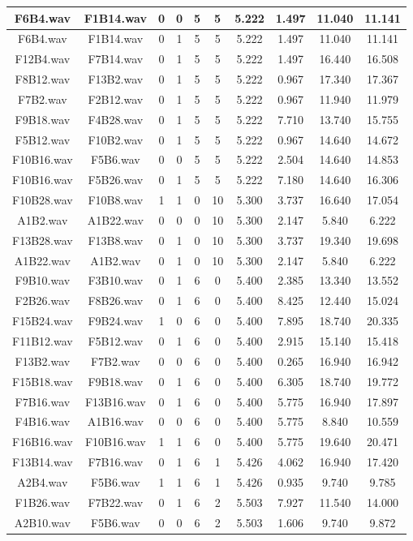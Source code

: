 \documentclass[11pt,a4paper,twoside]{book}
\begin{document}
\begin{longtable}[c]{|c|c|c|c|c|c|c|c|c|c|}
F6B4.wav&F1B14.wav&0&0&5&5&5.222&1.497&11.040&11.141\\ \hline
F6B4.wav&F1B14.wav&0&1&5&5&5.222&1.497&11.040&11.141\\ \hline
F12B4.wav&F7B14.wav&0&1&5&5&5.222&1.497&16.440&16.508\\ \hline
F8B12.wav&F13B2.wav&0&1&5&5&5.222&0.967&17.340&17.367\\ \hline
F7B2.wav&F2B12.wav&0&1&5&5&5.222&0.967&11.940&11.979\\ \hline
F9B18.wav&F4B28.wav&0&1&5&5&5.222&7.710&13.740&15.755\\ \hline
F5B12.wav&F10B2.wav&0&1&5&5&5.222&0.967&14.640&14.672\\ \hline
F10B16.wav&F5B6.wav&0&0&5&5&5.222&2.504&14.640&14.853\\ \hline
F10B16.wav&F5B26.wav&0&1&5&5&5.222&7.180&14.640&16.306\\ \hline
F10B28.wav&F10B8.wav&1&1&0&10&5.300&3.737&16.640&17.054\\ \hline
A1B2.wav&A1B22.wav&0&0&0&10&5.300&2.147&5.840&6.222\\ \hline
F13B28.wav&F13B8.wav&0&1&0&10&5.300&3.737&19.340&19.698\\ \hline
A1B22.wav&A1B2.wav&0&1&0&10&5.300&2.147&5.840&6.222\\ \hline
F9B10.wav&F3B10.wav&0&1&6&0&5.400&2.385&13.340&13.552\\ \hline
F2B26.wav&F8B26.wav&0&1&6&0&5.400&8.425&12.440&15.024\\ \hline
F15B24.wav&F9B24.wav&1&0&6&0&5.400&7.895&18.740&20.335\\ \hline
F11B12.wav&F5B12.wav&0&1&6&0&5.400&2.915&15.140&15.418\\ \hline
F13B2.wav&F7B2.wav&0&0&6&0&5.400&0.265&16.940&16.942\\ \hline
F15B18.wav&F9B18.wav&0&1&6&0&5.400&6.305&18.740&19.772\\ \hline
F7B16.wav&F13B16.wav&0&1&6&0&5.400&5.775&16.940&17.897\\ \hline
F4B16.wav&A1B16.wav&0&0&6&0&5.400&5.775&8.840&10.559\\ \hline
F16B16.wav&F10B16.wav&1&1&6&0&5.400&5.775&19.640&20.471\\ \hline
F13B14.wav&F7B16.wav&0&1&6&1&5.426&4.062&16.940&17.420\\ \hline
A2B4.wav&F5B6.wav&1&1&6&1&5.426&0.935&9.740&9.785\\ \hline
F1B26.wav&F7B22.wav&0&1&6&2&5.503&7.927&11.540&14.000\\ \hline
A2B10.wav&F5B6.wav&0&0&6&2&5.503&1.606&9.740&9.872\\ \hline

\end{longtable}
\end{document}
